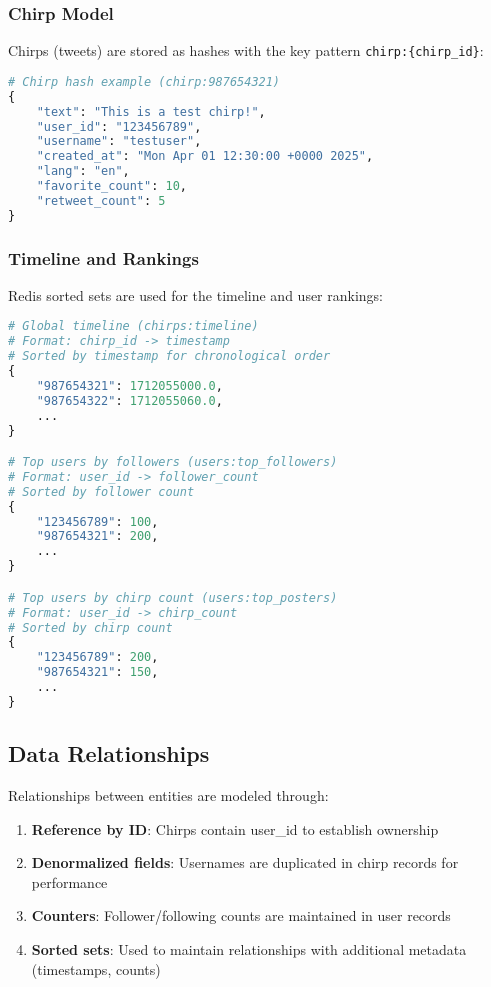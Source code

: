 \documentclass[a4paper,11pt]{article}
\begin{document}
\subsubsection{Chirp Model}
Chirps (tweets) are stored as hashes with the key pattern \texttt{chirp:\{chirp\_id\}}:

\begin{lstlisting}[language=Python, caption=Chirp data structure in Redis]
# Chirp hash example (chirp:987654321)
{
    "text": "This is a test chirp!",
    "user_id": "123456789",
    "username": "testuser",
    "created_at": "Mon Apr 01 12:30:00 +0000 2025",
    "lang": "en",
    "favorite_count": 10,
    "retweet_count": 5
}
\end{lstlisting}

\subsubsection{Timeline and Rankings}
Redis sorted sets are used for the timeline and user rankings:

\begin{lstlisting}[language=Python, caption=Timeline and ranking data structures]
# Global timeline (chirps:timeline)
# Format: chirp_id -> timestamp
# Sorted by timestamp for chronological order
{
    "987654321": 1712055000.0,
    "987654322": 1712055060.0,
    ...
}

# Top users by followers (users:top_followers)
# Format: user_id -> follower_count
# Sorted by follower count
{
    "123456789": 100,
    "987654321": 200,
    ...
}

# Top users by chirp count (users:top_posters)
# Format: user_id -> chirp_count
# Sorted by chirp count
{
    "123456789": 200,
    "987654321": 150,
    ...
}
\end{lstlisting}

\subsection{Data Relationships}
Relationships between entities are modeled through:

\begin{enumerate}
    \item \textbf{Reference by ID}: Chirps contain user\_id to establish ownership
    \item \textbf{Denormalized fields}: Usernames are duplicated in chirp records for performance
    \item \textbf{Counters}: Follower/following counts are maintained in user records
    \item \textbf{Sorted sets}: Used to maintain relationships with additional metadata (timestamps, counts)
\end{enumerate}
\end{document}
